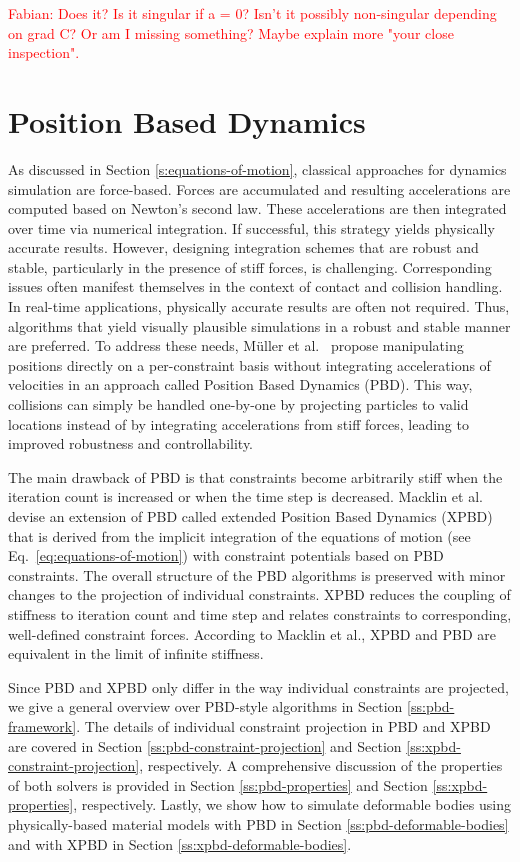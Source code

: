 \textcolor{red}{Fabian: Does it? Is it singular if a = 0? Isn't it possibly non-singular depending on grad C? Or am I missing something? 
Maybe explain more "your close inspection".}

\section{Position Based Dynamics}\label{s:pbd}
As discussed in Section \ref{s:equations-of-motion}, classical approaches for dynamics simulation are force-based. Forces are accumulated and 
resulting accelerations are computed based on Newton's second law. These accelerations are then integrated over time via numerical integration. 
If successful, this strategy yields physically accurate results. However, designing integration schemes that are robust and stable,
particularly in the presence of stiff forces, is challenging. Corresponding issues often manifest themselves in the context of contact and collision 
handling. In real-time applications, physically accurate results are often not required. Thus, algorithms that yield visually
plausible simulations in a robust and stable manner are preferred. To address these needs, Müller et al.\ \cite{mueller2006} propose manipulating
positions directly on a per-constraint basis without integrating accelerations of velocities in an approach called Position Based Dynamics (PBD).
This way, collisions can simply be handled one-by-one by projecting particles to valid locations instead of by integrating accelerations from 
stiff forces, leading to improved robustness and controllability. 

The main drawback of PBD is that constraints become arbitrarily stiff when the iteration count is increased or when the time step is decreased.
Macklin et al.\ \cite{macklin2016} devise an extension of PBD called extended Position Based Dynamics (XPBD) that is derived from the implicit
integration of the equations of motion (see Eq.\ \ref{eq:equations-of-motion}) with constraint potentials based on PBD constraints. The overall structure 
of the PBD algorithms is preserved with 
minor changes to the projection of individual constraints. XPBD reduces the coupling of stiffness to iteration count and time step and relates 
constraints to corresponding, well-defined constraint forces. According to Macklin et al., XPBD and PBD are equivalent in the limit of infinite
stiffness. 

Since PBD and XPBD only differ in the way individual constraints are projected, we give a general overview over PBD-style algorithms 
in Section \ref{ss:pbd-framework}. 
The details of individual constraint projection in PBD and XPBD are covered in Section \ref{ss:pbd-constraint-projection} and 
Section \ref{ss:xpbd-constraint-projection}, respectively. A comprehensive discussion of the properties of both solvers is provided in 
Section \ref{ss:pbd-properties} and Section \ref{ss:xpbd-properties}, respectively. Lastly, we show how to simulate deformable bodies using physically-based 
material models with PBD in Section \ref{ss:pbd-deformable-bodies} and with XPBD in Section \ref{ss:xpbd-deformable-bodies}.

